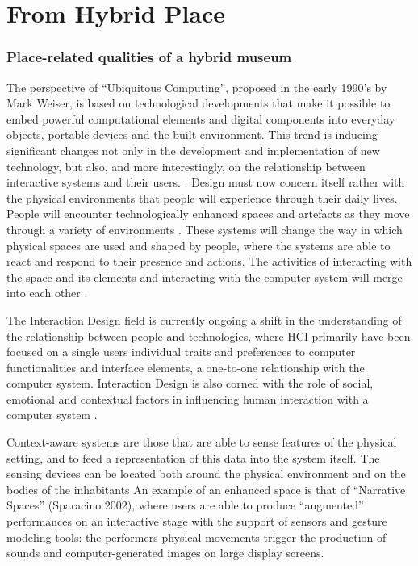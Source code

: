 \section{From Hybrid Place}

\subsubsection{Place-related qualities of a hybrid museum}
The perspective of “Ubiquitous Computing”, proposed in the early 1990’s by Mark Weiser, is based on technological developments that make it possible to embed powerful computational elements and digital components into everyday objects, portable devices and the built environment. This trend is inducing significant changes not only in the development and implementation of new technology, but also, and more interestingly, on the relationship between interactive systems and their users. \autocite[p. 217]{ciolfi_space_2005}. Design must now concern itself rather with the physical environments that people will experience through their daily lives. People will encounter technologically enhanced spaces and artefacts as they move through a variety of environments \autocite[p. 217]{ciolfi_space_2005}. These systems will change the way in which physical spaces are used and shaped by people, where the systems are able to react and respond to their presence and actions. The activities of interacting with the space and its elements and interacting with the computer system will merge into each other \autocite[p. 217]{ciolfi_space_2005}. 

The Interaction Design field is currently ongoing a shift in the understanding of the relationship between people and technologies, where HCI primarily have been focused on a single users individual traits and preferences to computer functionalities and interface elements, a one-to-one relationship with the computer system. Interaction Design is also corned with the role of social, emotional and contextual factors in influencing human interaction with a computer system \autocite[p. 217]{ciolfi_space_2005}.

Context-aware systems are those that are able to sense features of the physical setting, and to feed a representation of this data into the system itself. The sensing devices can be located both around the physical environment and on the bodies of the inhabitants \autocite[p. 218]{ciolfi_space_2005} An example of an enhanced space is that of “Narrative Spaces” (Sparacino 2002), where users are able to produce “augmented” performances on an interactive stage with the support of sensors and gesture modeling tools: the performers physical movements trigger the production of sounds and computer-generated images on large display screens\autocite[p. 219]{ciolfi_space_2005}. 

